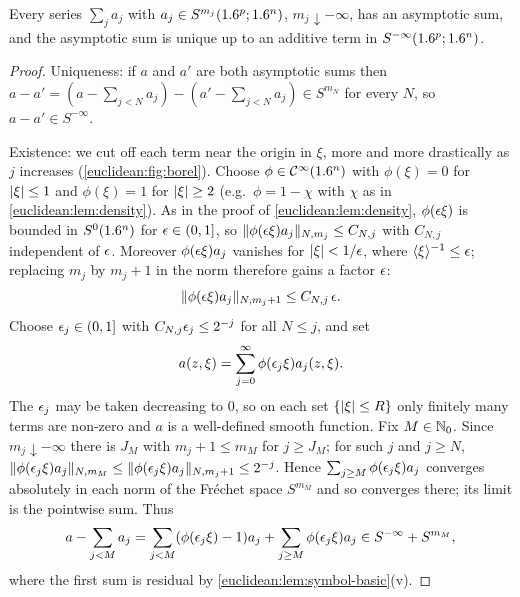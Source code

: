 \begin{proposition}\label{euclidean:prop:borel}
  Every series $\sum_ja_j$ with $a_j\in S^{m_j}(1.6^p;1.6^n)$, $m_j\downarrow-\infty$,
  has an asymptotic sum, and the asymptotic sum is unique up to an additive
  term in $S^{-\infty}(1.6^p;1.6^n)$.
\end{proposition}
\begin{proof}
  Uniqueness: if $a$ and $a'$ are both asymptotic sums then
  $a-a'=(a-\sum_{j<N}a_j)-(a'-\sum_{j<N}a_j)\in S^{m_N}$ for every $N$, so
  $a-a'\in S^{-\infty}$.

  Existence: we cut off each term near the origin in $\xi$, more and more
  drastically as $j$ increases (\cref{euclidean:fig:borel}). Choose $\phi\in\mathcal{C}^\infty(1.6^n)$ with
  $\phi(\xi)=0$ for $\lvert \xi\rvert\le1$ and $\phi(\xi)=1$ for $\lvert \xi\rvert\ge2$
  (e.g.\ $\phi=1-\chi$ with $\chi$ as in \cref{euclidean:lem:density}).
  As in the proof of \cref{euclidean:lem:density}, $\phi(\epsilon\xi)$ is
  bounded in $S^0(1.6^n)$ for $\epsilon\in(0,1]$, so
  $\lVert \phi(\epsilon\xi)a_j\rVert_{N,m_j}\le C_{N,j}$ with $C_{N,j}$ independent
  of $\epsilon$. Moreover $\phi(\epsilon\xi)a_j$ vanishes for $\lvert \xi\rvert<1/\epsilon$, where
  $\langle \xi\rangle^{-1}\le\epsilon$; replacing $m_j$ by $m_j+1$ in the norm therefore
  gains a factor $\epsilon$:
  \begin{equation}\label{euclidean:eq:borel-gain}
    \lVert \phi(\epsilon\xi)a_j\rVert_{N,m_j+1}\le C_{N,j}\,\epsilon.
  \end{equation}
  Choose $\epsilon_j\in(0,1]$ with
  $C_{N,j}\epsilon_j\le2^{-j}$ for all $N\le j$, and set
  \begin{equation*}
    a(z,\xi)=\sum_{j=0}^\infty\phi(\epsilon_j\xi)a_j(z,\xi).
  \end{equation*}
  The $\epsilon_j$ may be taken decreasing to $0$, so on each set
  $\{\lvert \xi\rvert\le R\}$ only finitely many terms are non-zero and $a$ is a
  well-defined smooth function. Fix $M\in\mathbb{N}_0$. Since $m_j\downarrow-\infty$
  there is $J_M$ with $m_j+1\le m_M$ for $j\ge J_M$; for such $j$ and
  $j\ge N$,
  $\lVert \phi(\epsilon_j\xi)a_j\rVert_{N,m_M}\le\lVert \phi(\epsilon_j\xi)a_j\rVert_{N,m_j+1}\le2^{-j}$.
  Hence $\sum_{j\ge M}\phi(\epsilon_j\xi)a_j$ converges absolutely in each norm
  of the Fr\'echet space $S^{m_M}$ and so converges there; its limit is the
  pointwise sum. Thus
  \begin{equation*}
    a-\sum_{j<M}a_j=\sum_{j<M}(\phi(\epsilon_j\xi)-1)a_j+\sum_{j\ge M}\phi(\epsilon_j\xi)a_j
    \in S^{-\infty}+S^{m_M},
  \end{equation*}
  where the first sum is residual by \cref{euclidean:lem:symbol-basic}(v).
\end{proof}

